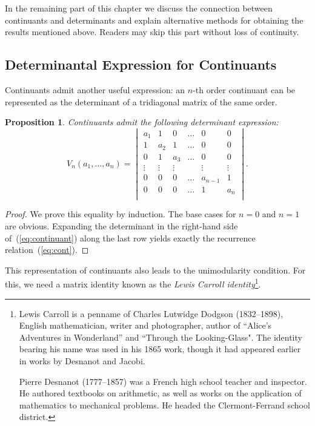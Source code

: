 \documentclass[a4paper,11pt]{amsart}
\theoremstyle{plain}
\newtheorem{prop}[theorem]{Proposition}
\theoremstyle{remark}
\theoremstyle{definition}
\numberwithin{equation}{section}
\numberwithin{figure}{section}
\begin{document}
{\small
In the remaining part of this chapter we discuss the connection between continuants and determinants and explain alternative methods for obtaining the results mentioned above. Readers may skip this part without loss of continuity.

\subsection{Determinantal Expression for Continuants}\label{ssec:det} Continuants admit another useful expression: an $n$-th order continuant can be represented as the determinant of a tridiagonal matrix of the same order.

\begin{prop}\label{prop:contdet} Continuants admit the following determinant expression:
\begin{equation}\label{eq:continuant}
V_n(a_1,\dots,a_n)=\begin{vmatrix} a_1 &1 & 0 &\dots & 0 &0\\
1& a_2 & 1 &\dots &0 &0\\
0 & 1 & a_3 & \dots & 0& 0\\
\vdots &\vdots &\vdots &&\vdots &\vdots\\
0 & 0 & 0 &\dots & a_{n-1} & 1\\
0 & 0 & 0 &\dots &1& a_{n} \\
\end{vmatrix}.
\end{equation}   
\end{prop}

\begin{proof} We prove this equality by induction. The base cases for $n=0$ and $n=1$ are obvious. Expanding the determinant in the right-hand side of~(\ref{eq:continuant}) along the last row yields exactly the recurrence relation~(\ref{eq:cont}).
\end{proof}

This representation of continuants also leads to the unimodularity condition. For this, we need a matrix identity known as the \emph{Lewis Carroll identity}\footnote{Lewis Carroll is a penname of Charles Lutwidge Dodgson (1832--1898), English mathematician, writer and photographer, author of ``Alice's Adventures in Wonderland'' and ``Through the Looking-Glass". The identity bearing his name was used in his 1865 work, though it had appeared earlier in works by Desnanot and Jacobi.

Pierre Desnanot (1777--1857) was a French high school teacher and inspector. He authored textbooks on arithmetic, as well as works on the application of mathematics to mechanical problems. He headed the Clermont-Ferrand school district.}.

}
\end{document}
